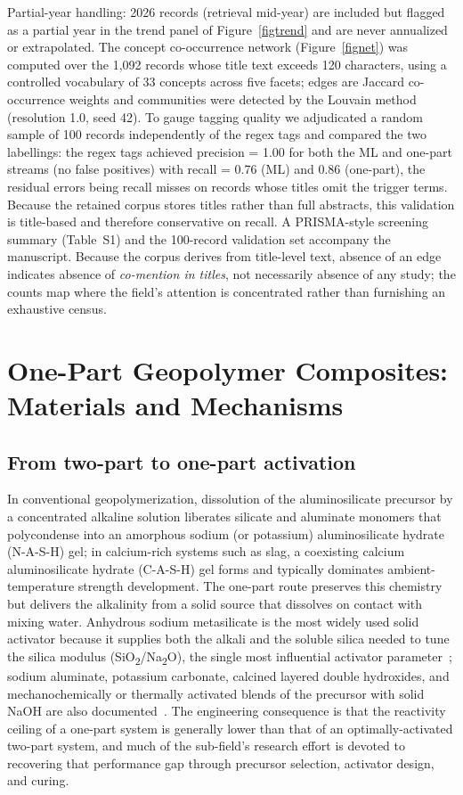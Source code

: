 \documentclass[materials,article,submit,pdftex,moreauthors]{Definitions/mdpi}
\begin{document}
Partial-year handling: 2026 records (retrieval mid-year) are included but flagged as a partial year in the trend panel of Figure~\ref{figtrend} and are never annualized or extrapolated. The concept co-occurrence network (Figure~\ref{fignet}) was computed over the 1{,}092 records whose title text exceeds 120 characters, using a controlled vocabulary of 33 concepts across five facets; edges are Jaccard co-occurrence weights and communities were detected by the Louvain method (resolution 1.0, seed 42). To gauge tagging quality we adjudicated a random sample of 100 records independently of the regex tags and compared the two labellings: the regex tags achieved precision = 1.00 for both the ML and one-part streams (no false positives) with recall = 0.76 (ML) and 0.86 (one-part), the residual errors being recall misses on records whose titles omit the trigger terms. Because the retained corpus stores titles rather than full abstracts, this validation is title-based and therefore conservative on recall. A PRISMA-style screening summary (Table~S1) and the 100-record validation set accompany the manuscript. Because the corpus derives from title-level text, absence of an edge indicates absence of \emph{co-mention in titles}, not necessarily absence of any study; the counts map where the field's attention is concentrated rather than furnishing an exhaustive census.
\fussy

\section{One-Part Geopolymer Composites: Materials and Mechanisms}
\subsection{From two-part to one-part activation}

In conventional geopolymerization, dissolution of the aluminosilicate precursor by a concentrated alkaline solution liberates silicate and aluminate monomers that polycondense into an amorphous sodium (or potassium) aluminosilicate hydrate (N-A-S-H) gel; in calcium-rich systems such as slag, a coexisting calcium aluminosilicate hydrate (C-A-S-H) gel forms and typically dominates ambient-temperature strength development. The one-part route preserves this chemistry but delivers the alkalinity from a solid source that dissolves on contact with mixing water. Anhydrous sodium metasilicate is the most widely used solid activator because it supplies both the alkali and the soluble silica needed to tune the silica modulus (SiO\textsubscript{2}/Na\textsubscript{2}O), the single most influential activator parameter~\cite{ref24}; sodium aluminate, potassium carbonate, calcined layered double hydroxides, and mechanochemically or thermally activated blends of the precursor with solid NaOH are also documented~\cite{ref16,ref17,ref20}. The engineering consequence is that the reactivity ceiling of a one-part system is generally lower than that of an optimally-activated two-part system, and much of the sub-field's research effort is devoted to recovering that performance gap through precursor selection, activator design, and curing.
\end{document}
